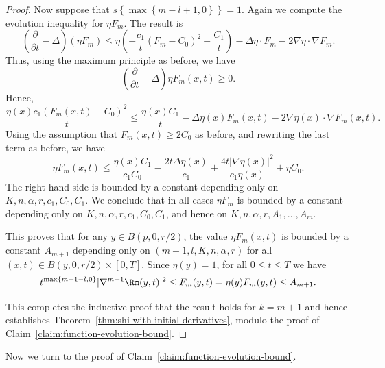 \begin{proof}
Now suppose that $s\left\{  \max\left\{  m-l+1,0\right\}
\right\}=1.$ Again we compute the evolution inequality for $\eta
F_{m}$. The result is $$\left(  \frac{\partial}{\partial
t}-\Delta\right) \left(  \eta F_{m}\right) \leq\eta\left(
-\frac{c_1}{t} (F_{m}-C_0)^{2}+\frac{C_1}{t}\right) -\Delta\eta\cdot
F_m-2\nabla\eta\cdot\nabla F_m.$$ Thus,  using the maximum principle
as before, we have
$$\left(  \frac{\partial}{\partial t}-\Delta\right)\eta  F_{m}(x,t)\ge 0.$$
Hence,
$$\frac{\eta(x) c_1(F_m(x,t)-C_0)^2}{t}\le
\frac{\eta(x)C_1}{t}-\Delta\eta(x)F_m(x,t)-2\nabla\eta(x)\cdot\nabla F_m(x,t).$$
Using the assumption that $F_m(x,t)\ge 2C_0$ as before, and rewriting the last
term as before, we have
$$\eta F_m(x,t)\le
\frac{\eta(x)C_1}{c_1C_0}-\frac{2t\Delta\eta(x)}
{c_1}+\frac{4t|\nabla\eta(x)|^2}{c_1\eta(x)}+\eta C_0.$$ The right-hand side is
bounded by a constant depending only on $K,n,\alpha,r,c_1,C_0,C_1$. We conclude
that in all cases $\eta F_{m}$ is bounded by a constant depending only on
$K,n,\alpha,r,c_1,C_0,C_1$, and hence on $K,n,\alpha,r,A_1,\ldots,A_m$.


This proves that for any $y\in B(p,0,r/2)$, the value
 $\eta F_m(x,t)$ is bounded by a
constant $A_{m+1}$ depending only on $(m+1,l,K,n,\alpha,r)$ for all
$(x,t)\in B(y,0,r/2)\times [0,T]$. Since $\eta(y)=1$, for all $0\le t\le T$ we have
$$t^{\max\{m+1-l,0\}}|\nabla^{m+1}\Rm(y,t)|^2\le F_m(y,t)=\eta(y)F_m(y,t)\le A_{m+1}.$$



This completes the inductive proof that the result holds for
$k=m+1$ and hence establishes Theorem~\ref{thm:shi-with-initial-derivatives}, modulo the proof of Claim~\ref{claim:function-evolution-bound}.
\end{proof}




Now we turn to the proof of Claim~\ref{claim:function-evolution-bound}.

